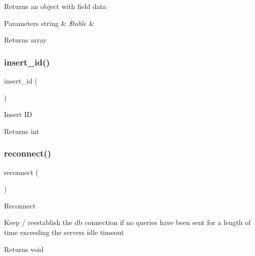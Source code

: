 Returns an object with field data


\begin{DoxyParams}[1]{Parameters}
string & {\em \$table} & \\
\hline
\end{DoxyParams}
\begin{DoxyReturn}{Returns}
array 
\end{DoxyReturn}
\mbox{\label{class_c_i___d_b__mysql__driver_a933f2cde8dc7f87875e257d0a4902e99}} 
\subsubsection{\texorpdfstring{insert\+\_\+id()}{insert\_id()}}
{\footnotesize\ttfamily insert\+\_\+id (\begin{DoxyParamCaption}{ }\end{DoxyParamCaption})}

Insert ID

\begin{DoxyReturn}{Returns}
int 
\end{DoxyReturn}
\mbox{\label{class_c_i___d_b__mysql__driver_a57c19c642ab3023e28d10c50f86ff0a8}} 
\subsubsection{\texorpdfstring{reconnect()}{reconnect()}}
{\footnotesize\ttfamily reconnect (\begin{DoxyParamCaption}{ }\end{DoxyParamCaption})}

Reconnect

Keep / reestablish the db connection if no queries have been sent for a length of time exceeding the server\textquotesingle{}s idle timeout

\begin{DoxyReturn}{Returns}
void 
\end{DoxyReturn}
\mbox{\label{class_c_i___d_b__mysql__driver_a6080dae0886626b9a4cedb29240708b1}} 
